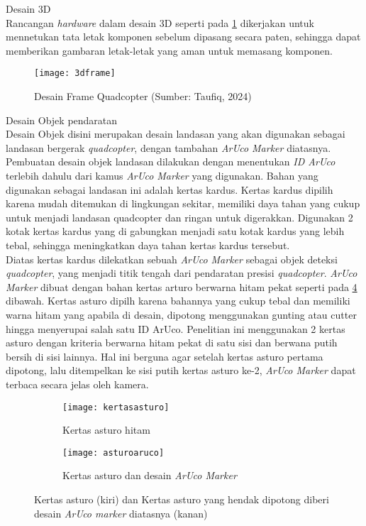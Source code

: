 \begin{packed_enum}
	\item Desain 3D
	\\ Rancangan \textit{hardware} dalam desain 3D seperti pada \cref{fig:3dframe} dikerjakan untuk mennetukan tata letak komponen sebelum dipasang secara paten, sehingga dapat memberikan gambaran letak-letak yang aman untuk memasang komponen.
	
	\begin{figure}[H]
		\centering
		\texttt{[image: 3dframe]}
		\caption{Desain Frame Quadcopter (Sumber: Taufiq, 2024)}
		\label{fig:3dframe}
	\end{figure}
	
	\item Desain Objek pendaratan
	\\ Desain Objek disini merupakan desain landasan yang akan digunakan sebagai landasan bergerak \textit{quadcopter}, dengan tambahan \textit{ArUco Marker} diatasnya. Pembuatan desain objek landasan dilakukan dengan menentukan \textit{ID ArUco} terlebih dahulu dari kamus \textit{ArUco Marker} yang digunakan. Bahan yang digunakan sebagai landasan ini adalah kertas kardus. Kertas kardus dipilih karena mudah ditemukan di lingkungan sekitar, memiliki daya tahan yang cukup untuk menjadi landasan quadcopter dan ringan untuk digerakkan. Digunakan 2 kotak kertas kardus yang di gabungkan menjadi satu kotak kardus yang lebih tebal, sehingga meningkatkan daya tahan kertas kardus tersebut. 	
	\\ Diatas kertas kardus dilekatkan sebuah \textit{ArUco Marker} sebagai objek deteksi \textit{quadcopter}, yang menjadi titik tengah dari pendaratan presisi \textit{quadcopter}. \textit{ArUco Marker} dibuat dengan bahan kertas arturo berwarna hitam pekat seperti pada \cref{fig:arucoasturo2} dibawah. Kertas asturo dipilh karena bahannya yang cukup tebal dan memiliki warna hitam yang apabila di desain, dipotong menggunakan gunting atau cutter hingga menyerupai salah satu ID ArUco. Penelitian ini menggunakan 2 kertas asturo dengan kriteria berwarna hitam pekat di satu sisi dan berwana putih bersih di sisi lainnya. Hal ini berguna agar setelah kertas asturo pertama dipotong, lalu ditempelkan ke sisi putih kertas asturo ke-2, \textit{ArUco Marker} dapat terbaca secara jelas oleh kamera.
	
	\begin{figure}[H]
		\centering
		\begin{subfigure}[b]{0.45\textwidth}
			\centering
			\texttt{[image: kertasasturo]}
			\caption{Kertas asturo hitam}
			\label{fig:kertasasturo}
		\end{subfigure}
		\hfill
		\begin{subfigure}[b]{0.45\textwidth}
			\centering
			\texttt{[image: asturoaruco]}
			\caption{Kertas asturo dan desain \textit{ArUco Marker}}
			\label{fig:asturoaruco}
		\end{subfigure}
		\caption{Kertas asturo (kiri) dan Kertas asturo yang hendak dipotong diberi desain \textit{ArUco marker} diatasnya (kanan)}
		\label{fig:arucoasturo2}
	\end{figure}
	

\end{packed_enum}
